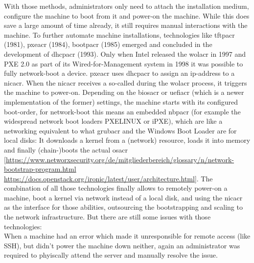 \newline
With those methods, administrators only need to attach the installation medium, configure the machine to boot from it and power-on the machine. While this does save a large amount of time already, it still requires manual interactions with the machine.
\newline
To further automate machine installations, technologies like \gls{tftpacr} (1981), \gls{pxeacr} (1984), \gls{bootpacr} (1985) emerged and concluded in the development of \gls{dhcpacr} (1993). Only when Intel released the \gls{wolacr} in 1997 and PXE 2.0 as part of its Wired-for-Management system in 1998 it was possible to fully network-boot a device.
\newline
\Gls{pxeacr} uses \gls{dhcpacr} to assign an ip-address to a \gls{nicacr}. When the \gls{nicacr} receives a so-called  during the \gls{wolacr} process, it triggers the machine to power-on. Depending on the \gls{biosacr} or \gls{uefiacr} (which is a newer implementation of the former) settings, the machine starts with its configured boot-order, for network-boot this means an embedded \gls{nbpacr} (for example the widespread network boot loaders PXELINUX or iPXE), which are like a networking equivalent to what \gls{grubacr} and the Windows Boot Loader are for local disks: It downloads a kernel from a (network) resource, loads it into memory and finally (chain-)boots the actual \gls{osacr} [\url{https://www.networxsecurity.org/de/mitgliederbereich/glossary/n/network-bootstrap-program.html} \url{https://docs.openstack.org/ironic/latest/user/architecture.html}].
\newline
The combination of all those technologies finally allows to remotely power-on a machine, boot a kernel via network instead of a local disk, and using the \gls{nicacr} as the interface for those abilities, outsourcing the bootstrapping and scaling to the network infrastructure.
\newline
But there are still some issues with those technologies: \\
When a machine had an error which made it unresponsible for remote access (like SSH), but didn't power the machine down neither, again an administrator was required to phyiscally attend the server and manually resolve the issue.
\newline
